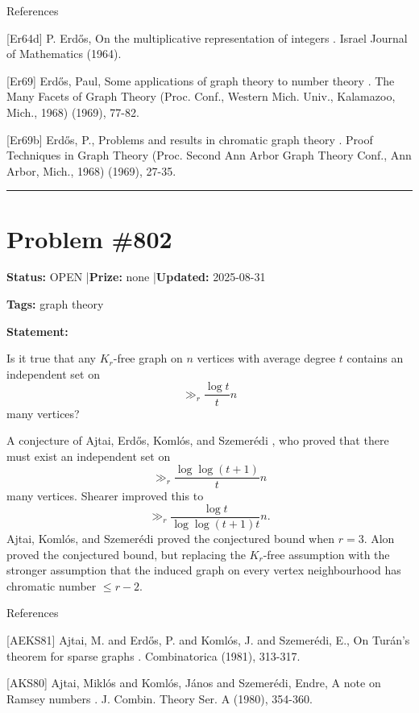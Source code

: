 \documentclass{article}
\begin{document}
References

[Er64d] P. Erd\H{o}s, On the multiplicative representation of integers . Israel Journal of Mathematics (1964).

[Er69] Erd\H{o}s, Paul, Some applications of graph theory to number theory . The Many Facets of Graph Theory (Proc. Conf., Western Mich. Univ., Kalamazoo, Mich., 1968) (1969), 77-82.

[Er69b] Erd\H{o}s, P., Problems and results in chromatic graph theory . Proof Techniques in Graph Theory (Proc. Second Ann Arbor Graph Theory Conf., Ann Arbor, Mich., 1968) (1969), 27-35.

\noindent\rule{\linewidth}{0.4pt}


\section{Problem \#802}
\label{prob:802}

\noindent\textbf{Status:} OPEN \quad|\quad \textbf{Prize:} none \quad|\quad \textbf{Updated:} 2025-08-31

\noindent\textbf{Tags:} graph theory

\medskip

\noindent\textbf{Statement:}

Is it true that any $K_r$-free graph on $n$ vertices with average degree $t$ contains an independent set on\[\gg_r \frac{\log t}{t}n\]many vertices?




A conjecture of Ajtai, Erd\H{o}s, Koml\'{o}s, and Szemer\'{e}di \cite{AEKS81}, who proved that there must exist an independent set on\[\gg_r \frac{\log\log(t+1)}{t}n\]many vertices. Shearer \cite{Sh95} improved this to\[\gg_r \frac{\log t}{\log\log(t+1)t}n.\]Ajtai, Koml\'{o}s, and Szemer\'{e}di \cite{AKS80} proved the conjectured bound when $r=3$. Alon \cite{Al96b} proved the conjectured bound, but replacing the $K_r$-free assumption with the stronger assumption that the induced graph on every vertex neighbourhood has chromatic number $\leq r-2$.




References

[AEKS81] Ajtai, M. and Erd\H{o}s, P. and Koml\'{o}s, J. and Szemer\'{e}di, E., On Tur\'{a}n's theorem for sparse graphs . Combinatorica (1981), 313-317.

[AKS80] Ajtai, Mikl\'{o}s and Koml\'{o}s, J\'{a}nos and Szemer\'{e}di, Endre, A note on Ramsey numbers . J. Combin. Theory Ser. A (1980), 354-360.
\end{document}
